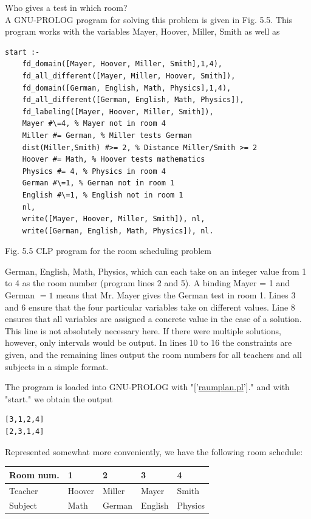 \documentclass[10pt]{book}
\begin{document}
Who gives a test in which room?\\
A GNU-PROLOG program for solving this problem is given in Fig. 5.5. This program works with the variables Mayer, Hoover, Miller, Smith as well as

\begin{verbatim}
start :-
    fd_domain([Mayer, Hoover, Miller, Smith],1,4),
    fd_all_different([Mayer, Miller, Hoover, Smith]),
    fd_domain([German, English, Math, Physics],1,4),
    fd_all_different([German, English, Math, Physics]),
    fd_labeling([Mayer, Hoover, Miller, Smith]),
    Mayer #\=4, % Mayer not in room 4
    Miller #= German, % Miller tests German
    dist(Miller,Smith) #>= 2, % Distance Miller/Smith >= 2
    Hoover #= Math, % Hoover tests mathematics
    Physics #= 4, % Physics in room 4
    German #\=1, % German not in room 1
    English #\=1, % English not in room 1
    nl,
    write([Mayer, Hoover, Miller, Smith]), nl,
    write([German, English, Math, Physics]), nl.
\end{verbatim}

Fig. 5.5 CLP program for the room scheduling problem

German, English, Math, Physics, which can each take on an integer value from 1 to 4 as the room number (program lines 2 and 5). A binding Mayer = 1 and German $=1$ means that Mr. Mayer gives the German test in room 1. Lines 3 and 6 ensure that the four particular variables take on different values. Line 8 ensures that all variables are assigned a concrete value in the case of a solution. This line is not absolutely necessary here. If there were multiple solutions, however, only intervals would be output. In lines 10 to 16 the constraints are given, and the remaining lines output the room numbers for all teachers and all subjects in a simple format.

The program is loaded into GNU-PROLOG with "['\href{http://raumplan.pl}{raumplan.pl}']." and with "start." we obtain the output

\begin{verbatim}
[3,1,2,4]
[2,3,1,4]
\end{verbatim}

Represented somewhat more conveniently, we have the following room schedule:

\begin{center}
\begin{tabular}{lllll}
\hline
Room num. & 1 & 2 & 3 & 4 \\
\hline
Teacher & Hoover & Miller & Mayer & Smith \\
\hline
Subject & Math & German & English & Physics \\
\hline
\end{tabular}
\end{center}
\end{document}
